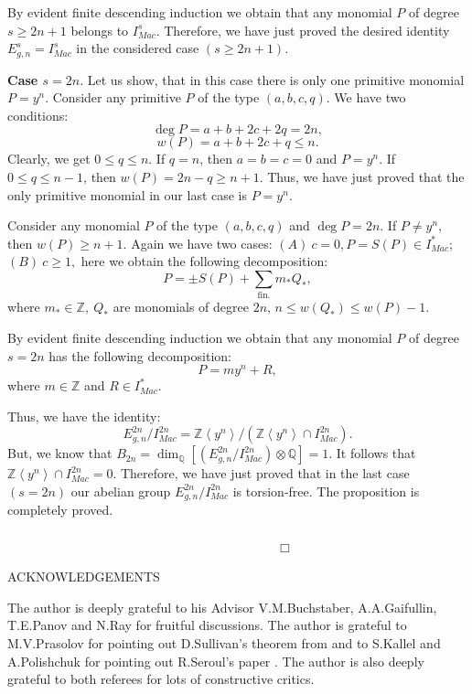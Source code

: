 \documentclass[a4paper,14pt]{article}
\newcommand{\Q}{\mathbb{Q}}
\newcommand{\Z}{\mathbb{Z}}
\begin{document}
By evident finite descending induction we obtain that any monomial $P$ of degree $s\ge 2n+1$ belongs to $I^s_{Mac}$. Therefore, we have just proved the desired identity $E^s_{g,n}=I^s_{Mac}$ in the considered case $(s\ge 2n+1)$.


{\bf Case $s=2n$}.  Let us show, that in this case there is only one primitive monomial $P=y^n$. Consider any primitive $P$ of the type $(a,b,c,q)$. We have two conditions:
$$
\deg P = a+b+2c +2q = 2n,
$$
$$
w(P) = a+b+2c +q \le n.
$$
Clearly, we get $0\le q\le n.$ If $q=n$, then $a=b=c=0$ and $P=y^n$. If $0\le q\le n-1$, then $w(P)= 2n - q\ge n+1$. Thus, we have just proved that the only primitive monomial in our last case is $P=y^n$.

Consider any monomial $P$ of the type $(a,b,c,q)$ and $\deg P=2n$. If $P\ne y^n$, then $w(P)\ge n+1$. Again we have two cases: $(A) \  c=0, P=S(P)\in I^*_{Mac}$; $(B) \ c\ge 1,$ here we obtain the following decomposition:
$$
P = \pm S(P) + \sum_{\mathrm{fin.}} m_*Q_*,
$$
where $m_*\in \Z, \  Q_*$ are monomials of degree $2n$, $n\le w(Q_*)\le w(P) - 1$. 

By evident finite descending induction we obtain that any monomial $P$ of degree $s=2n$ has the following decomposition:
$$
P = my^n + R,
$$
where $m\in \Z$ and $R\in I^*_{Mac}$.

Thus, we have the identity: 
$$
E^{2n}_{g,n}/ I^{2n}_{Mac} = \Z\left< y^n \right>/  (\Z\left< y^n \right>\cap I^{2n}_{Mac}).
$$ 
But, we know that $B_{2n} = \dim_{\Q} [(E^{2n}_{g,n}/ I^{2n}_{Mac}) \otimes \Q] = 1$. It follows that $\Z\left< y^n \right>\cap I^{2n}_{Mac} = 0$. Therefore, we have just proved that in the last case $(s=2n)$ our abelian group $E^{2n}_{g,n}/ I^{2n}_{Mac}$ is torsion-free. The proposition is completely proved.  \ \ \ \ \ \ \ \ \ \ \ \ \ \ \ \ \ \ \ \ \ \ \ \ \ \ \ \ \ \ \ \ \  \ \ \ \ \ \  \ \ \ \ \ \ \ \ \ \ \ \ \ \ \ \ \ \ \ \ \ \ \ \ \ \ \ \ \ \ \ \ \ \ \ \ \ \ \ \ \ \ \ \ \ \ \ \ \ \ \ \ \ \ \ \ \ \ \ \ \ \ \ \ \ \ \ \ \ \ \ \   \ \ \  $\Box$




\bigskip

\centerline{ \large ACKNOWLEDGEMENTS}   

\bigskip

The author is deeply grateful to his Advisor V.M.Buchstaber, A.A.Gaifullin, T.E.Panov and N.Ray for fruitful discussions.  The author is grateful to M.V.Prasolov for pointing out  D.Sullivan's theorem from \cite{Sul} and to S.Kallel and A.Polishchuk for pointing out R.Seroul's paper \cite{Ser}. The author is also deeply grateful to both referees for lots of constructive critics. 
\end{document}
